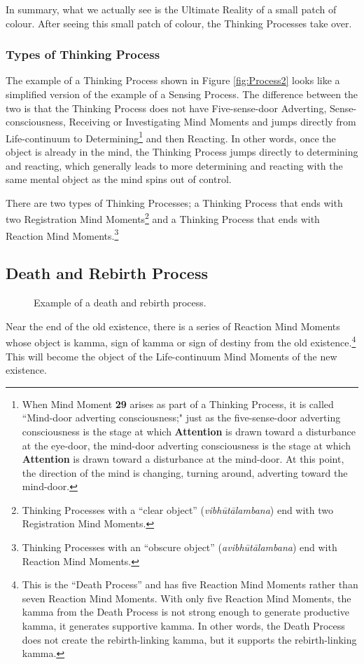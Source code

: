 In summary, what we actually see is the Ultimate Reality of a small patch of colour. After seeing this small patch of colour, the Thinking Processes take over.

\subsubsection*{Types of Thinking Process}

The example of a Thinking Process shown in Figure \ref{fig:Process2} looks like a simplified version of the example of a Sensing Process. The difference between the two is that the Thinking Process does not have Five-sense-door Adverting, Sense-consciousness, Receiving or Investigating Mind Moments and jumps directly from Life-continuum to Determining\footnote{When Mind Moment \textbf{29} arises as part of a Thinking Process, it is called “Mind-door adverting consciousness;" just as the five-sense-door adverting consciousness is the stage at which \textbf{Attention} is drawn toward a disturbance at the eye-door, the mind-door adverting consciousness is the stage at which \textbf{Attention} is drawn toward a disturbance at the mind-door. At this point, the direction of the mind is changing, turning around, adverting toward the mind-door.} and then Reacting. In other words, once the object is already in the mind, the Thinking Process jumps directly to determining and reacting, which generally leads to more determining and reacting with the same mental object as the mind spins out of control.

There are two types of Thinking Processes; a Thinking Process that ends with two Registration Mind Moments\footnote{Thinking Processes with a “clear object” (\textit{vibhūtālambana}) end with two Registration Mind Moments.} and a Thinking Process that ends with Reaction Mind Moments.\footnote{Thinking Processes with an “obscure object” (\textit{avibhūtālambana}) end with Reaction Mind Moments.}

\subsection*{Death and Rebirth Process}

\begin{figure}[H]
\centering

\caption{Example of a death and rebirth process.}
\label{fig:Death}
\end{figure}

Near the end of the old existence, there is a series of Reaction Mind Moments whose object is kamma, sign of kamma or sign of destiny from the old existence.\footnote{This is the “Death Process” and has five Reaction Mind Moments rather than seven Reaction Mind Moments. With only five Reaction Mind Moments, the kamma from the Death Process is not strong enough to generate productive kamma, it generates supportive kamma. In other words, the Death Process does not create the rebirth-linking kamma, but it supports the rebirth-linking kamma.} This will become the object of the Life-continuum Mind Moments of the new existence. 

